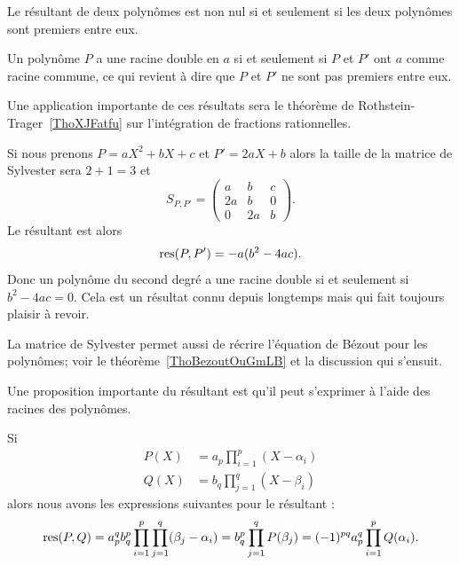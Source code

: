 \begin{proposition} \label{PropAPxzcUl}
    Le résultant de deux polynômes est non nul si et seulement si les deux polynômes sont premiers entre eux.
\end{proposition}

Un polynôme \( P\) a une racine double en \( a\) si et seulement si \( P\) et \( P'\) ont \( a\) comme racine commune, ce qui revient à dire que \( P\) et \( P'\) ne sont pas premiers entre eux.

Une application importante de ces résultats sera le théorème de Rothstein-Trager~\ref{ThoXJFatfu} sur l'intégration de fractions rationnelles.

\begin{example}
    Si nous prenons \( P=aX^2+bX+c\) et \( P'=2aX+b\) alors la taille de la matrice de Sylvester sera \( 2+1=3\) et
    \begin{equation}
        S_{P,P'}=\begin{pmatrix}
              a  &   b    &   c    \\
            2a    &   b    &   0    \\
            0    &   2a    &   b
        \end{pmatrix}.
    \end{equation}
    Le résultant est alors
    \begin{equation}
        \operatorname{res}(P,P')=-a(b^2-4ac).
    \end{equation}
    Donc un polynôme du second degré a une racine double si et seulement si \( b^2-4ac=0\). Cela est un résultat connu depuis longtemps mais qui fait toujours plaisir à revoir.
\end{example}

La matrice de Sylvester permet aussi de récrire l'équation de Bézout pour les polynômes; voir le théorème~\ref{ThoBezoutOuGmLB} et la discussion qui s'ensuit.

Une proposition importante du résultant est qu'il peut s'exprimer à l'aide des racines des polynômes.
\begin{proposition} \label{PropNDBOGNx}
    Si
    \begin{subequations}
        \begin{align}
        P(X)&=a_p\prod_{i=1}^p(X-\alpha_i)\\
        Q(X)&=b_q\prod_{j=1}^q(X-\beta_i)
        \end{align}
    \end{subequations}
    alors nous avons les expressions suivantes pour le résultant :
    \begin{equation}        \label{EqCFUumjx}
        \operatorname{res}(P,Q)=a_p^qb_q^p\prod_{i=1}^p\prod_{j=1}^q(\beta_j-\alpha_i)=b_q^p\prod_{j=1}^qP(\beta_j)=(-1)^{pq}a_p^q\prod_{i=1}^pQ(\alpha_i).
    \end{equation}
\end{proposition}

